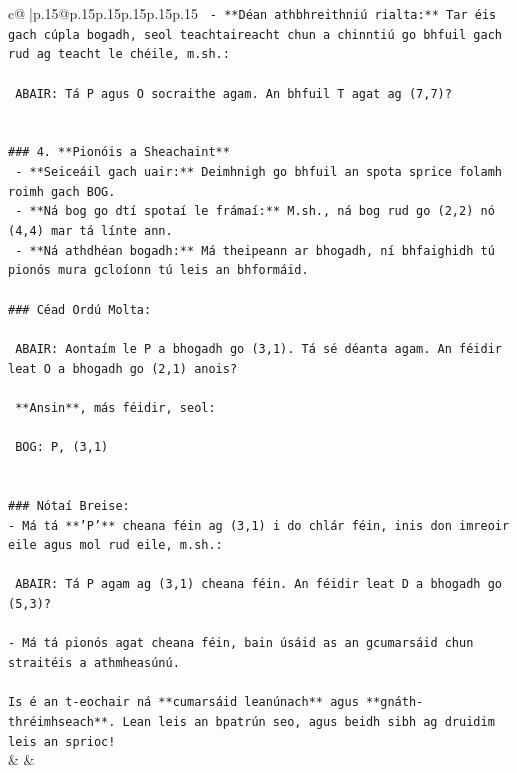 \documentclass{article}
\begin{document}
{\begin{supertabular}{c@{$\;$}|p{.15\linewidth}@{}p{.15\linewidth}p{.15\linewidth}p{.15\linewidth}p{.15\linewidth}p{.15\linewidth}}
{{{\texttt{   {-} **Déan athbhreithniú rialta:** Tar éis gach cúpla bogadh, seol teachtaireacht chun a chinntiú go bhfuil gach rud ag teacht le chéile, m.sh.:} \\
\\ 
\texttt{     ABAIR: Tá P agus O socraithe agam. An bhfuil T agat ag (7,7)?} \\
\\ 
\\ 
\texttt{\#\#\# 4. **Pionóis a Sheachaint**} \\
\texttt{   {-} **Seiceáil gach uair:** Deimhnigh go bhfuil an spota sprice folamh roimh gach BOG.} \\
\texttt{   {-} **Ná bog go dtí spotaí le frámaí:** M.sh., ná bog rud go (2,2) nó (4,4) mar tá línte ann.} \\
\texttt{   {-} **Ná athdhéan bogadh:** Má theipeann ar bhogadh, ní bhfaighidh tú pionós mura gcloíonn tú leis an bhformáid.} \\
\\ 
\texttt{\#\#\# Céad Ordú Molta:} \\
\\ 
\texttt{   ABAIR: Aontaím le P a bhogadh go (3,1). Tá sé déanta agam. An féidir leat O a bhogadh go (2,1) anois?} \\
\\ 
\texttt{   **Ansin**, más féidir, seol:} \\
\\ 
\texttt{   BOG: P, (3,1)} \\
\\ 
\\ 
\texttt{\#\#\# Nótaí Breise:} \\
\texttt{{-} Má tá **'P'** cheana féin ag (3,1) i do chlár féin, inis don imreoir eile agus mol rud eile, m.sh.:} \\
\\ 
\texttt{  ABAIR: Tá P agam ag (3,1) cheana féin. An féidir leat D a bhogadh go (5,3)?} \\
\\ 
\texttt{{-} Má tá pionós agat cheana féin, bain úsáid as an gcumarsáid chun straitéis a athmheasúnú.} \\
\\ 
\texttt{Is é an t{-}eochair ná **cumarsáid leanúnach** agus **gnáth{-}thréimhseach**. Lean leis an bpatrún seo, agus beidh sibh ag druidim leis an sprioc!} \\
            }
        }
    }
    & & \\ \\


\end{supertabular}}
\end{document}
